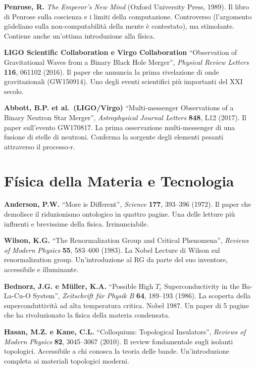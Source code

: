 \documentclass[11.5pt,a4paper,openany]{book}
\theoremstyle{remark}
\begin{document}
\textbf{Penrose, R.} \textit{The Emperor's New Mind} (Oxford University Press, 1989). Il libro di Penrose sulla coscienza e i limiti della computazione. Controverso (l'argomento gödeliano sulla non-computabilità della mente è contestato), ma stimolante. Contiene anche un'ottima introduzione alla física.

\textbf{LIGO Scientific Collaboration e Virgo Collaboration} ``Observation of Gravitational Waves from a Binary Black Hole Merger'', \textit{Physical Review Letters} \textbf{116}, 061102 (2016). Il paper che annuncia la prima rivelazione di onde gravitazionali (GW150914). Uno degli eventi scientifici più importanti del XXI secolo.

\textbf{Abbott, B.P. et al.\ (LIGO/Virgo)} ``Multi-messenger Observations of a Binary Neutron Star Merger'', \textit{Astrophysical Journal Letters} \textbf{848}, L12 (2017). Il paper sull'evento GW170817. La prima osservazione multi-messenger di una fusione di stelle di neutroni. Conferma la sorgente degli elementi pesanti attraverso il processo-r.

\section{Física della Materia e Tecnologia}

\textbf{Anderson, P.W.} ``More is Different'', \textit{Science} \textbf{177}, 393--396 (1972). Il paper che demolisce il riduzionismo ontologico in quattro pagine. Una delle letture più influenti e brevissime della fisica. Irrinunciabile.

\textbf{Wilson, K.G.} ``The Renormalization Group and Critical Phenomena'', \textit{Reviews of Modern Physics} \textbf{55}, 583--600 (1983). La Nobel Lecture di Wilson sul renormalization group. Un'introduzione al RG da parte del suo inventore, accessibile e illuminante.

\textbf{Bednorz, J.G. e Müller, K.A.} ``Possible High $T_c$ Superconductivity in the Ba-La-Cu-O System'', \textit{Zeitschrift für Physik B} \textbf{64}, 189--193 (1986). La scoperta della superconduttività ad alta temperatura critica. Nobel 1987. Un paper di 5 pagine che ha rivoluzionato la fisica della materia condensata.

\textbf{Hasan, M.Z. e Kane, C.L.} ``Colloquium: Topological Insulators'', \textit{Reviews of Modern Physics} \textbf{82}, 3045--3067 (2010). Il review fondamentale sugli isolanti topologici. Accessibile a chi conosca la teoria delle bande. Un'introduzione completa ai materiali topologici moderni.
\end{document}
